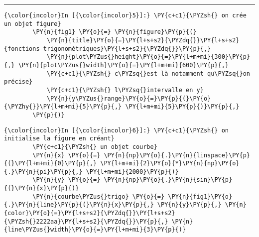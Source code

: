     
    
    
    
    \begin{center}\rule{0.5\linewidth}{\linethickness}\end{center}

    \begin{Verbatim}[commandchars=\\\{\}]
{\color{incolor}In [{\color{incolor}5}]:} \PY{c+c1}{\PYZsh{} on crée un objet figure}
        \PY{n}{fig1} \PY{o}{=} \PY{n}{figure}\PY{p}{(}
            \PY{n}{title}\PY{o}{=}\PY{l+s+s2}{\PYZdq{}}\PY{l+s+s2}{fonctions trigonométriques}\PY{l+s+s2}{\PYZdq{}}\PY{p}{,}
            \PY{n}{plot\PYZus{}height}\PY{o}{=}\PY{l+m+mi}{300}\PY{p}{,} \PY{n}{plot\PYZus{}width}\PY{o}{=}\PY{l+m+mi}{600}\PY{p}{,}
            \PY{c+c1}{\PYZsh{} c\PYZsq{}est là notamment qu\PYZsq{}on précise}
            \PY{c+c1}{\PYZsh{} l\PYZsq{}intervalle en y}
            \PY{n}{y\PYZus{}range}\PY{o}{=}\PY{p}{(}\PY{o}{\PYZhy{}}\PY{l+m+mi}{5}\PY{p}{,} \PY{l+m+mi}{5}\PY{p}{)}\PY{p}{,}
        \PY{p}{)}
\end{Verbatim}


    \begin{Verbatim}[commandchars=\\\{\}]
{\color{incolor}In [{\color{incolor}6}]:} \PY{c+c1}{\PYZsh{} on initialise la figure en créant}
        \PY{c+c1}{\PYZsh{} un objet courbe}
        \PY{n}{x} \PY{o}{=} \PY{n}{np}\PY{o}{.}\PY{n}{linspace}\PY{p}{(}\PY{l+m+mi}{0}\PY{p}{,} \PY{l+m+mi}{2}\PY{o}{*}\PY{n}{np}\PY{o}{.}\PY{n}{pi}\PY{p}{,} \PY{l+m+mi}{2000}\PY{p}{)}
        \PY{n}{y} \PY{o}{=} \PY{n}{np}\PY{o}{.}\PY{n}{sin}\PY{p}{(}\PY{n}{x}\PY{p}{)}
        \PY{n}{courbe\PYZus{}trigo} \PY{o}{=} \PY{n}{fig1}\PY{o}{.}\PY{n}{line}\PY{p}{(}\PY{n}{x}\PY{p}{,} \PY{n}{y}\PY{p}{,} \PY{n}{color}\PY{o}{=}\PY{l+s+s2}{\PYZdq{}}\PY{l+s+s2}{\PYZsh{}2222aa}\PY{l+s+s2}{\PYZdq{}}\PY{p}{,} \PY{n}{line\PYZus{}width}\PY{o}{=}\PY{l+m+mi}{3}\PY{p}{)}
\end{Verbatim}


